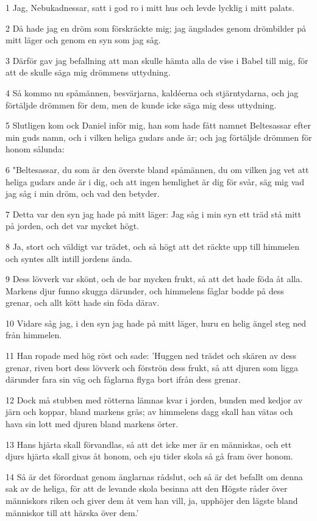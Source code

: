 \par 1 Jag, Nebukadnessar, satt i god ro i mitt hus och levde lycklig i mitt palats.
\par 2 Då hade jag en dröm som förskräckte mig; jag ängslades genom drömbilder på mitt läger och genom en syn som jag såg.
\par 3 Därför gav jag befallning att man skulle hämta alla de vise i Babel till mig, för att de skulle säga mig drömmens uttydning.
\par 4 Så kommo nu spåmännen, besvärjarna, kaldéerna och stjärntydarna, och jag förtäljde drömmen för dem, men de kunde icke säga mig dess uttydning.
\par 5 Slutligen kom ock Daniel inför mig, han som hade fått namnet Beltesassar efter min guds namn, och i vilken heliga gudars ande är; och jag förtäljde drömmen för honom sålunda:
\par 6 "Beltesassar, du som är den överste bland spåmännen, du om vilken jag vet att heliga gudars ande är i dig, och att ingen hemlighet är dig för svår, säg mig vad jag såg i min dröm, och vad den betyder.
\par 7 Detta var den syn jag hade på mitt läger: Jag såg i min syn ett träd stå mitt på jorden, och det var mycket högt.
\par 8 Ja, stort och väldigt var trädet, och så högt att det räckte upp till himmelen och syntes allt intill jordens ända.
\par 9 Dess lövverk var skönt, och de bar mycken frukt, så att det hade föda åt alla. Markens djur funno skugga därunder, och himmelens fåglar bodde på dess grenar, och allt kött hade sin föda därav.
\par 10 Vidare såg jag, i den syn jag hade på mitt läger, huru en helig ängel steg ned från himmelen.
\par 11 Han ropade med hög röst och sade: 'Huggen ned trädet och skären av dess grenar, riven bort dess lövverk och förströn dess frukt, så att djuren som ligga därunder fara sin väg och fåglarna flyga bort ifrån dess grenar.
\par 12 Dock må stubben med rötterna lämnas kvar i jorden, bunden med kedjor av järn och koppar, bland markens gräs; av himmelens dagg skall han vätas och hava sin lott med djuren bland markens örter.
\par 13 Hans hjärta skall förvandlas, så att det icke mer är en människas, och ett djurs hjärta skall givas åt honom, och sju tider skola så gå fram över honom.
\par 14 Så är det förordnat genom änglarnas rådslut, och så är det befallt om denna sak av de heliga, för att de levande skola besinna att den Högste råder över människors riken och giver dem åt vem han vill, ja, upphöjer den lägste bland människor till att härska över dem.'

